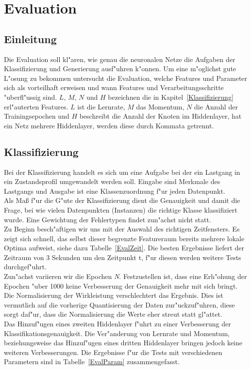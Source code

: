 \section{Evaluation}
\label{Evaluation}

\subsection{Einleitung}
\label{Einleitung}
Die Evaluation soll kl"aren, wie genau die neuronalen Netze die Aufgaben der Klassifizierung und Generierung ausf"uhren k"onnen. Um eine m"oglichst gute L"osung zu bekommen untersucht die Evaluation, welche Features und Parameter sich als vorteilhaft erweisen und wann Features und Verarbeitungsschritte "uberfl"ussig sind. $L$, $M$, $N$ und $H$ bezeichnen die in Kapitel~\ref{Klassifizierung} erl"auterten Features. $L$ ist die Lernrate, $M$ das Momentum, $N$ die Anzahl der Trainingsepochen und $H$ beschreibt die Anzahl der Knoten im Hiddenlayer, hat ein Netz mehrere Hiddenlayer, werden diese durch Kommata getrennt.

\subsection{Klassifizierung}
\label{EvalKlassifizierung}
Bei der Klassifizierung handelt es sich um eine Aufgabe bei der ein Lastgang in ein Zustandsprofil umgewandelt werden soll. Eingabe sind Merkmale des Lastgangs und Ausgabe ist eine Klassenzuordnung f"ur jeden Datenpunkt.\\
Als Ma{\ss} f"ur die G"ute der Klassifizierung dient die Genauigkeit und damit die Frage, bei wie vielen Datenpunkten (Instanzen) die richtige Klasse klassifiziert wurde. Eine Gewichtung der Fehlertypen findet zun"achst nicht statt.\\

Zu Beginn besch"aftigen wir uns mit der Auswahl des richtigen Zeitfensters. Es zeigt sich schnell, das selbst dieser begrenzte Featureraum bereits mehrere lokale Optima aufweist, siehe dazu Tabelle~\ref{EvalZeit}. Die besten Ergebnisse liefert der Zeitraum von 3 Sekunden um den Zeitpunkt t, f"ur diesen werden weitere Tests durchgef"uhrt.\\

Zun"achst variieren wir die Epochen \textit{N}. Festzustellen ist, dass eine Erh"ohung der Epochen "uber 1000 keine Verbesserung der Genauigkeit mehr mit sich bringt. Die Normalisierung der Wirkleistung verschlechtert das Ergebnis. Dies ist vermutlich auf die vorherige Quantisierung der Daten zur"uckzuf"uhren, diese sorgt daf"ur, dass die Normalisierung die Werte eher streut statt gl"attet. \\
Das Hinzuf"ugen eines zweiten Hiddenlayer f"uhrt zu einer Verbesserung der Klassifikationsgenauigkeit. Die Ver"anderung von Lernrate und Momentum, beziehungsweise das Hinzuf"ugen eines dritten Hiddenlayer bringen jedoch keine weiteren Verbesserungen. Die Ergebnisse f"ur die Tests mit verschiedenen Parametern sind in Tabelle~\ref{EvalParam} zusammengefasst.\\

